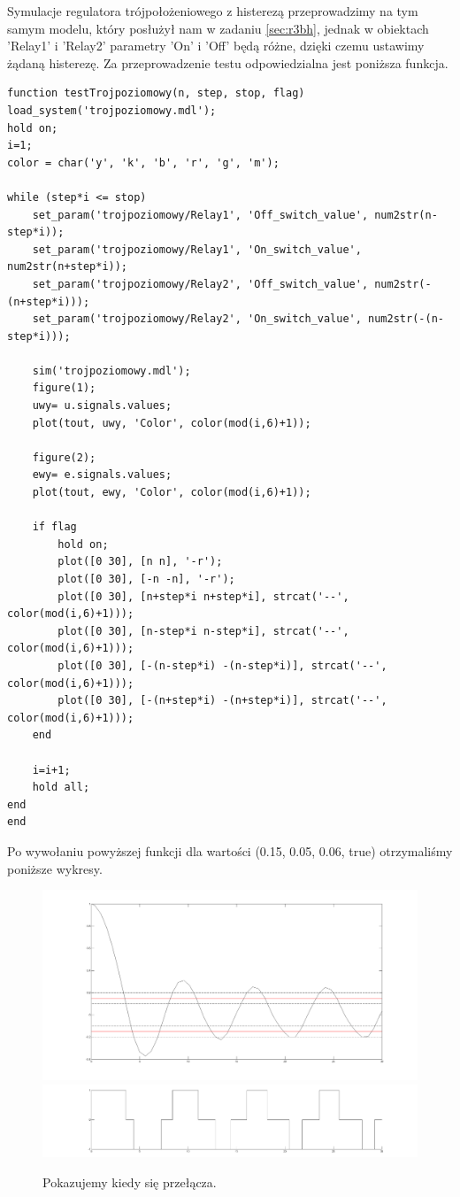 \documentclass[a4paper,10pt]{article}
\begin{document}
Symulacje regulatora trójpołożeniowego z histerezą przeprowadzimy na tym samym modelu, który posłużył nam w zadaniu \ref{sec:r3bh}, jednak w obiektach 'Relay1' i 'Relay2' parametry 'On' i 'Off' będą różne, dzięki czemu ustawimy żądaną histerezę.
Za przeprowadzenie testu odpowiedzialna jest poniższa funkcja.

\begin{lstlisting}[caption=Funkcja testująca regulator dwupoziomowy z histerezą.]
function testTrojpoziomowy(n, step, stop, flag)
load_system('trojpoziomowy.mdl');
hold on;
i=1;
color = char('y', 'k', 'b', 'r', 'g', 'm');

while (step*i <= stop)
    set_param('trojpoziomowy/Relay1', 'Off_switch_value', num2str(n-step*i));
    set_param('trojpoziomowy/Relay1', 'On_switch_value', num2str(n+step*i));
    set_param('trojpoziomowy/Relay2', 'Off_switch_value', num2str(-(n+step*i)));
    set_param('trojpoziomowy/Relay2', 'On_switch_value', num2str(-(n-step*i)));

    sim('trojpoziomowy.mdl');
    figure(1);
    uwy= u.signals.values;    
    plot(tout, uwy, 'Color', color(mod(i,6)+1));

    figure(2);
    ewy= e.signals.values;    
    plot(tout, ewy, 'Color', color(mod(i,6)+1));

    if flag
        hold on;
        plot([0 30], [n n], '-r');
        plot([0 30], [-n -n], '-r');
        plot([0 30], [n+step*i n+step*i], strcat('--', color(mod(i,6)+1)));
        plot([0 30], [n-step*i n-step*i], strcat('--', color(mod(i,6)+1)));
        plot([0 30], [-(n-step*i) -(n-step*i)], strcat('--', color(mod(i,6)+1)));
        plot([0 30], [-(n+step*i) -(n+step*i)], strcat('--', color(mod(i,6)+1)));
    end

    i=i+1;
    hold all;
end
end
\end{lstlisting}


Po wywołaniu powyższej funkcji dla wartości (0.15, 0.05, 0.06, true) otrzymaliśmy poniższe wykresy.

\begin{figure}[!h]
    \centering
	\includegraphics[width=120mm]{CW3-trojpolozeniowy-e-n015-a005.png}
	\includegraphics[width=120mm]{CW3-trojpolozeniowy-u-n015-a005.png}
	\caption{Pokazujemy kiedy się przełącza.}
    \label{fig:Rysunek}
\end{figure}
\end{document}
